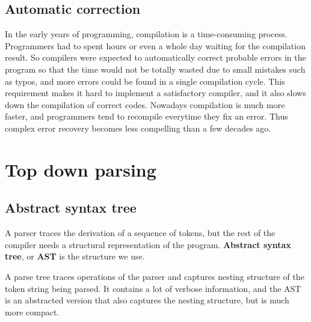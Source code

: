 \subsection{Automatic correction}
In the early years of programming, compilation is a time-consuming process. Programmers had to spent hours or even a whole day waiting for the compilation result. So compilers were expected to automatically correct probable errors in the program so that the time would not be totally wasted due to small mistakes such as typos, and more errors could be found in a single compilation cycle. This requirement makes it hard to implement a satisfactory compiler, and it also slows down the compilation of correct codes. Nowadays compilation is much more faster, and programmers tend to recompile everytime they fix an error. Thus complex error recovery becomes less compelling than a few decades ago.

\section{Top down parsing}
\subsection{Abstract syntax tree}
A parser traces the derivation of a sequence of tokens, but the rest of the compiler needs a structural representation of the program. {\bf Abstract syntax tree}, or {\bf AST} is the structure we use.

A parse tree traces operations of the parser and captures nesting structure of the token string being parsed. It contains a lot of verbose information, and the AST is an abstracted version that also captures the nesting structure, but is much more compact.

